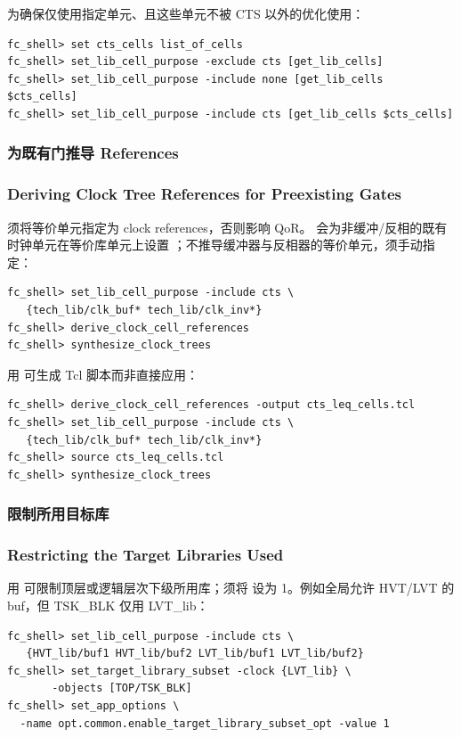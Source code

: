 为确保仅使用指定单元、且这些单元不被 CTS 以外的优化使用：
\begin{lstlisting}
fc_shell> set cts_cells list_of_cells
fc_shell> set_lib_cell_purpose -exclude cts [get_lib_cells]
fc_shell> set_lib_cell_purpose -include none [get_lib_cells $cts_cells]
fc_shell> set_lib_cell_purpose -include cts [get_lib_cells $cts_cells]
\end{lstlisting}

\subsubsection{为既有门推导 References}
\subsubsection*{Deriving Clock Tree References for Preexisting Gates}

须将等价单元指定为 clock references，否则影响 QoR。 会为非缓冲/反相的既有时钟单元在等价库单元上设置 ；不推导缓冲器与反相器的等价单元，须手动指定：
\begin{lstlisting}
fc_shell> set_lib_cell_purpose -include cts \
   {tech_lib/clk_buf* tech_lib/clk_inv*}
fc_shell> derive_clock_cell_references
fc_shell> synthesize_clock_trees
\end{lstlisting}

用  可生成 Tcl 脚本而非直接应用：
\begin{lstlisting}
fc_shell> derive_clock_cell_references -output cts_leq_cells.tcl
fc_shell> set_lib_cell_purpose -include cts \
   {tech_lib/clk_buf* tech_lib/clk_inv*}
fc_shell> source cts_leq_cells.tcl
fc_shell> synthesize_clock_trees
\end{lstlisting}

\subsubsection{限制所用目标库}
\subsubsection*{Restricting the Target Libraries Used}

用  可限制顶层或逻辑层次下级所用库；须将  设为 1。例如全局允许 HVT/LVT 的 buf，但 TSK\_BLK 仅用 LVT\_lib：
\begin{lstlisting}
fc_shell> set_lib_cell_purpose -include cts \
   {HVT_lib/buf1 HVT_lib/buf2 LVT_lib/buf1 LVT_lib/buf2}
fc_shell> set_target_library_subset -clock {LVT_lib} \
       -objects [TOP/TSK_BLK]
fc_shell> set_app_options \
  -name opt.common.enable_target_library_subset_opt -value 1
\end{lstlisting}

